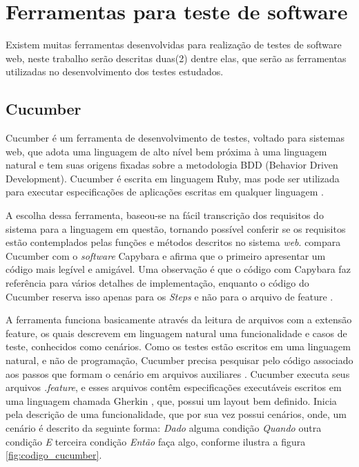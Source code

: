 \documentclass[tg]{mdtufsm}
\begin{document}
\section{Ferramentas para teste de software}
Existem muitas ferramentas desenvolvidas para realização de testes de software web, neste trabalho serão descritas duas(2) dentre elas, que serão as ferramentas utilizadas no desenvolvimento dos testes estudados.

\subsection{Cucumber}
Cucumber é um ferramenta de desenvolvimento de testes, voltado para sistemas web, que adota uma linguagem de alto nível bem próxima à uma linguagem natural e tem suas origens fixadas sobre a metodologia BDD (Behavior Driven Development). Cucumber é escrita em linguagem Ruby, mas pode ser utilizada para executar especificações de aplicações escritas em qualquer linguagem \cite{nunescucumber}.

A escolha dessa ferramenta, baseou-se na fácil transcrição dos requisitos do sistema para a linguagem em questão, tornando possível conferir se os requisitos estão contemplados pelas funções e métodos descritos no sistema \emph{web}. \citeauthor{lopescucumbervalor}\cite{lopescucumbervalor} compara Cucumber com o \emph{software} Capybara e afirma que o primeiro apresentar um código mais legível e amigável. Uma observação é que o código com Capybara faz referência para vários detalhes de implementação, enquanto o código do Cucumber reserva isso apenas para os \emph{Steps} e não para o arquivo de feature \cite{lopescucumbervalor}.

A ferramenta funciona basicamente através da leitura de arquivos com a extensão feature, os quais descrevem em linguagem natural uma funcionalidade e casos de teste, conhecidos como cenários.
Como os testes estão escritos em uma linguagem natural, e não de programação, Cucumber precisa pesquisar pelo código associado aos passos que formam o cenário em arquivos auxiliares \cite{scmitzcucumberreview}. Cucumber executa seus arquivos \emph{.feature}, e esses arquivos contêm especificações executáveis escritos em uma linguagem chamada Gherkin \cite{cucumberwiki}, que, possui um layout bem definido. Inicia pela descrição de uma funcionalidade, que por sua vez possui cenários, onde, um cenário é descrito da seguinte forma: \emph{Dado} alguma condição \emph{Quando} outra condição \emph{E} terceira condição \emph{Então} faça algo, conforme ilustra a figura \ref{fig:codigo_cucumber}.
\end{document}
